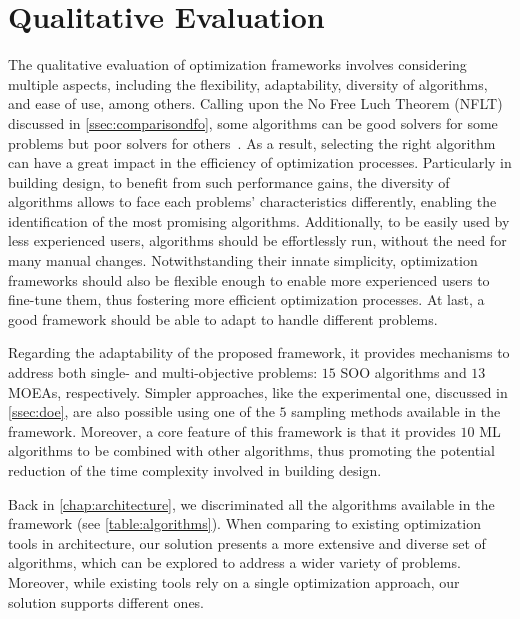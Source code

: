 \section{Qualitative Evaluation}
\label{sec:qualitative}

The qualitative evaluation of optimization frameworks involves considering multiple aspects, including the flexibility, adaptability, diversity of algorithms, and ease of use, among others. Calling upon the No Free Luch Theorem (\ac{NFLT}) discussed in \cref{ssec:comparisondfo}, some algorithms can be good solvers for some problems but poor solvers for others~\cite{Wolpert1997NFLT}. As a result, selecting the right algorithm can have a great impact in the efficiency of optimization processes. Particularly in building design, to benefit from such performance gains, the diversity of algorithms allows to face each problems' characteristics differently, enabling the identification of the most promising algorithms. Additionally, to be easily used by less experienced users, algorithms should be effortlessly run, without the need for many manual changes. Notwithstanding their innate simplicity, optimization frameworks should also be flexible enough to enable more experienced users to fine-tune them, thus fostering more efficient optimization processes. At last, a good framework should be able to adapt to handle different problems.

Regarding the adaptability of the proposed framework, it provides mechanisms to address both single- and multi-objective problems: $15$ \ac{SOO} algorithms and $13$ \acp{MOEA}, respectively. Simpler approaches, like the experimental one, discussed in \cref{ssec:doe}, are also possible using one of the $5$ sampling methods available in the framework. Moreover, a core feature of this framework is that it provides $10$ \ac{ML} algorithms to be combined with other algorithms, thus promoting the potential reduction of the time complexity involved in building design. 

Back in \cref{chap:architecture}, we discriminated all the algorithms available in the framework (see \cref{table:algorithms}). When comparing to existing optimization tools in architecture, our solution presents a more extensive and diverse set of algorithms, which can be explored to address a wider variety of problems. Moreover, while existing tools rely on a single optimization approach, our solution supports different ones.

